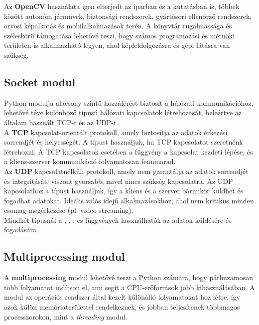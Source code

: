 Az \textbf{OpenCV }használata igen elterjedt az iparban és a kutatásban is, többek között autonóm járművek, biztonsági rendszerek, gyártósori ellenőrző rendszerek, orvosi képalkotás és mobilalkalmazások terén. A könyvtár rugalmassága és széleskörű támogatása lehetővé teszi, hogy számos programozási és mérnöki területen is alkalmazható legyen, ahol képfeldolgozásra és gépi látásra van szükség.

\subsection*{Socket modul \cite{socket}}

Python  modulja alacsony szintű hozzáférést biztosít a hálózati kommunikációhoz, lehetővé téve különböző típusú hálózati kapcsolatok létrehozását, beleértve az általam használt TCP-t és az UDP-t.\\

A \textbf{TCP} kapcsolat-orientált protokoll, amely biztosítja az adatok érkezési sorrendjét és helyességét. A  típust használjuk, ha TCP kapcsolatot szeretnénk létrehozni. A TCP kapcsolatok esetében a  függvény a kapcsolat kezdeti lépése, és a kliens-szerver kommunikáció folyamatosan fennmarad.\\

Az \textbf{UDP} kapcsolatnélküli protokoll, amely nem garantálja az adatok sorrendjét és integritását, viszont gyorsabb, mivel nincs szükség kapcsolatra. Az UDP kapcsolathoz a   típust használjuk, így a kliens és a szerver bármikor küldhet és fogadhat adatokat. Ideális valós idejű alkalmazásokhoz, ahol nem kritikus minden csomag megérkezése (pl. video streaming).\\

Mindkét típusnál a , , , és  függvények használhatók az adatok küldésére és fogadására.

\subsection*{Multiprocessing modul \cite{multiprocessing}}

A \textbf{multiprocessing} modul lehetővé teszi a Python számára, hogy párhuzamosan több folyamatot indítson el, ami segít a CPU-erőforrások jobb kihasználásában. A modul az operációs rendszer által kezelt különálló folyamatokat hoz létre, így azok külön memóriaterülettel rendelkeznek, és jobban teljesítenek többmagos processzorokon, mint a \textsl{threading} modul.\\ 

